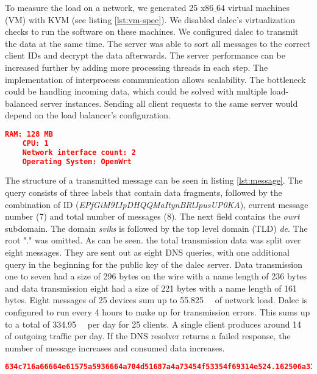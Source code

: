     To measure the load on a network, we generated 25 x86$\_$64 virtual machines (VM) with KVM (see listing \ref{lst:vm-spec}). We disabled dalec's virtualization checks to run the software on these machines. We configured dalec to transmit the data at the same time. The server was able to sort all messages to the correct client IDs and decrypt the data afterwards. The server performance can be increased further by adding more processing threads in each step. The implementation of interprocess communication allows scalability. The bottleneck could be handling incoming data, which could be solved with multiple load-balanced server instances. Sending all client requests to the same server would depend on the load balancer's configuration.\\
    \begin{lstlisting}[language=json, caption=virtual machine specifications, label=lst:vm-spec]
    RAM: 128 MB
    CPU: 1
    Network interface count: 2
    Operating System: OpenWrt
    \end{lstlisting}
    The structure of a transmitted message can be seen in listing \ref{lst:message}. The query consists of three labels that contain data fragments, followed by the combination of ID (\textit{EPfGiM9IJpDHQQMaItynBRlJpusUP0KA}), current message number (7) and total number of messages (8).     The next field contains the \textit{owrt} subdomain. The domain \textit{sviks} is followed by the top level domain (TLD) \textit{de}. The root "." was omitted.
    As can be seen. the total transmission data was split over eight messages.
    They are sent out as eight DNS queries, with one additional query in the beginning for the public key of the dalec server.
    Data transmission one to seven had a size of 296 bytes on the wire with a name length of 236 bytes and data transmission eight had a size of 221 bytes with a name length of 161 bytes. Eight messages of  25 devices sum up to \SIlist{55.825}{\kilo\byte} of network load. Dalec is configured to run every 4 hours to make up for transmission errors. 
    This sums up to a total of \SIlist{334.95}{\kilo\byte} per day for 25 clients. 
    A single client produces around \SIlist{14}{\kilo\byte} of outgoing traffic per day. If the DNS resolver returns a failed response, the number of message increases and consumed data increases.

    \begin{lstlisting}[language=json, caption=Layout of dalec message, label=lst:message]
634c716a66664e61575a5936664a704d51687a4a73454f53354f69314e524.162506a310a636136794752496d36794c5352626a6a464d765532636f4835.7258694279492b6b714c65507138426667596a31382b597a756d544267643.EPfGiM9IJpDHQQMaItynBRlJpusUP0KA-7-8.owrt.sviks.de
    \end{lstlisting}    
    
